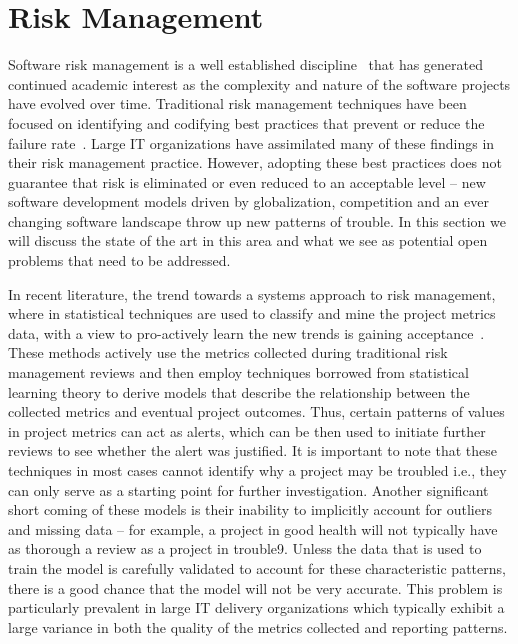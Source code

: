 \section{Risk Management}

Software risk management is a well established discipline~\cite{risk1,risk2} that has generated continued academic interest as the complexity and nature of the software projects have evolved over time. Traditional risk management techniques have been focused on identifying and codifying best practices that prevent or reduce the failure rate~\cite{risk3,risk4,risk5,risk6,risk7}. Large IT organizations have assimilated many of these findings in their risk management practice.  However, adopting these best practices does not guarantee that risk is eliminated or even reduced to an acceptable level -- new software development models driven by globalization, competition and an ever changing software landscape throw up new patterns of trouble. In this section we will discuss the state of the art in this area and what we see as potential open problems that need to be addressed.

In recent literature, the trend towards a systems approach to risk management, where in statistical techniques are used to classify and mine the project metrics data, with a view to pro-actively learn the new trends is gaining acceptance~\cite{risk8,risk9,risk10}.  These methods actively use the metrics collected during traditional risk management reviews and then employ techniques borrowed from statistical learning theory to derive models that describe the relationship between the collected metrics and eventual project outcomes. Thus, certain patterns of values in project metrics can act as alerts, which can be then used to initiate further reviews to see whether the alert was justified. It is important to note that these techniques in most cases cannot identify why a project may be troubled i.e., they can only serve as a starting point for further investigation.  Another significant short coming of these models is their inability to implicitly account for outliers and missing data -- for example, a project in good health will not typically have as thorough a review as a project in trouble9. Unless the data that is used to train the model is carefully validated to account for these characteristic patterns, there is a good chance that the model will not be very accurate. This problem is particularly prevalent in large IT delivery organizations which typically exhibit a large variance in both the quality of the metrics collected and reporting patterns.


